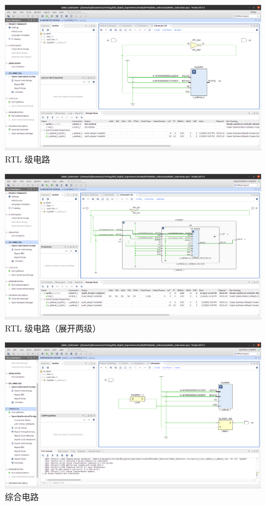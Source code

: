 \documentclass[11pt]{SEU-Digital-Report}
\begin{document}
        \begin{figure}[htbp]
          \centering
          \includegraphics[width=\linewidth]{fig/IP_RTL.png}
          \caption{RTL 级电路}
          \label{fig:IP_RTL}
        \end{figure}

        \newpage
        \begin{figure}[htbp]
          \centering
          \includegraphics[width=\linewidth]{fig/IP_RTL_detailed.png}
          \caption{RTL 级电路（展开两级）}
          \label{fig:IP_RTL_detailed}
        \end{figure}

        \begin{figure}[htbp]
          \centering
          \includegraphics[width=\linewidth]{fig/IP_sys.png}
          \caption{综合电路}
          \label{fig:IP_sys}
        \end{figure}
\end{document}
